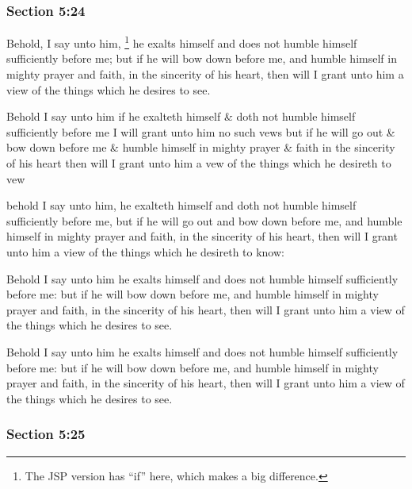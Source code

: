 	\subsubsection{Section 5:24} %
		\label{DC5-24}

		Behold, I say unto him,
			\footnote{%
				The JSP version has ``if'' here, which makes a big difference.
				}%
		he exalts himself and does not humble himself sufficiently before me; but if he will bow down before me, and humble himself in mighty prayer and faith, in the sincerity of his heart, then will I grant unto him a view of the things which he desires to see.

		\begin{framed}
		\scriptsize
			\begin{compactdesc}
				\item[JSP] Behold I say unto him if he exalteth himself \& doth not humble himself sufficiently before me I will grant unto him no such vews but if he will go out \& bow down before me \& humble himself in mighty prayer \& faith in the sincerity of his heart then will I grant unto him a vew of the things which he desireth to vew
				\item[RB1] [\textit{missing}]
				\item[BC] behold I say unto him, he exalteth himself and doth not humble himself sufficiently before me, but if he will go out and bow down before me, and humble himself in mighty prayer and faith, in the sincerity of his heart, then will I grant unto him a view of the things which he desireth to know:
				\item[DC 1835] Behold I say unto him he exalts himself and does not humble himself sufficiently before me: but if he will bow down before me, and humble himself in mighty prayer and faith, in the sincerity of his heart, then will I grant unto him a view of the things which he desires to see.
				\item[DC 1844] Behold I say unto him he exalts himself and does not humble himself sufficiently before me: but if he will bow down before me, and humble himself in mighty prayer and faith, in the sincerity of his heart, then will I grant unto him a view of the things which he desires to see.
			\end{compactdesc}
		\end{framed}

	\subsubsection{Section 5:25} %
		\label{DC5-25}


